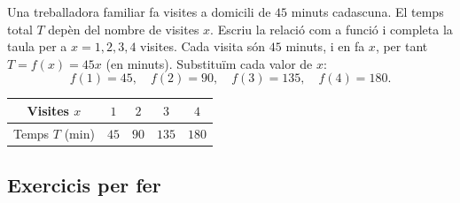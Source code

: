 \begin{exresolt}
Una treballadora familiar fa visites a domicili de $45$ minuts cadascuna. El temps
total $T$ depèn del nombre de visites $x$. Escriu la relació com a funció i completa
la taula per a $x=1,2,3,4$ visites.
\solucio
Cada visita són $45$ minuts, i en fa $x$, per tant $T=f(x)=45x$ (en minuts).
Substituïm cada valor de $x$:
\[
f(1)=45,\quad f(2)=90,\quad f(3)=135,\quad f(4)=180.
\]
\begin{center}
\begin{tabular}{c c c c c}
\toprule
Visites $x$ & $1$ & $2$ & $3$ & $4$ \\
\midrule
Temps $T$ (min) & $45$ & $90$ & $135$ & $180$ \\
\bottomrule
\end{tabular}
\end{center}
\end{exresolt}

\subsection{Exercicis per fer}

